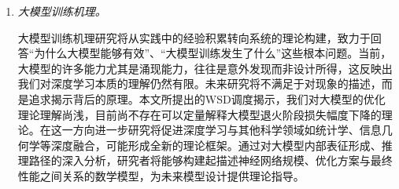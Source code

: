 \begin{enumerate}
\item \textit{大模型训练机理。} 


大模型训练机理研究将从实践中的经验积累转向系统的理论构建，致力于回答“为什么大模型能够有效”、“大模型训练发生了什么”这些根本问题。当前，大模型的许多能力尤其是涌现能力，往往是意外发现而非设计所得，这反映出我们对深度学习本质的理解仍然有限。未来研究将不满足于对现象的描述，而是追求揭示背后的原理。本文所提出的WSD调度揭示，我们对大模型的优化理论理解尚浅，目前尚不存在可以定量解释大模型退火阶段损失幅度下降的理论。在这一方向进一步研究将促进深度学习与其他科学领域如统计学、信息几何学等深度融合，可能形成全新的理论框架。通过对大模型内部表征形成、推理路径的深入分析，研究者将能够构建起描述神经网络规模、优化方案与最终性能之间关系的数学模型，为未来模型设计提供理论指导。

\end{enumerate}